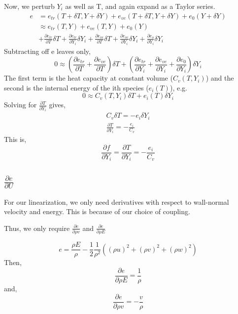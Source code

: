 \documentclass[10pt]{article}
\begin{document}
Now, we perturb $Y_i$ as well as T, and again expand as a Taylor
series. 
\begin{align}
 e &= e_{tr}(T+\delta T, Y + \delta Y ) + e_{ve}(T+\delta T, Y + \delta Y ) + e_{0}(Y + \delta Y) \\
 &\approx e_{tr}(T,Y) +  e_{ve}(T,Y) + e_{0}(Y) \\
 & + \frac{\partial e_{tr}}{\partial T} \delta T + \frac{\partial e_{tr}}{\partial Y_i} \delta Y_i
   + \frac{\partial e_{ve}}{\partial T} \delta T + \frac{\partial e_{ve}}{\partial Y_i} \delta Y_i 
   + \frac{\partial e_{o}}{\partial Y_i} \delta Y_i 
\end{align}
Subtracting off e leaves only,
\begin{equation}
0 \approx \left( \frac{\partial e_{tr}}{\partial T} + \frac{\partial
	   e_{ve}}{\partial T} \right) \delta T + 
           \left( \frac{\partial e_{tr}}{\partial Y_i} + \frac{\partial
	    e_{ve}}{\partial Y_i} + \frac{\partial
	    e_{0}}{\partial Y_i} \right) \delta Y_i
\end{equation}
The first term is the heat capacity at constant volume ($C_v(T,Y_i)$) and the
second is the internal energy of the ith species ($e_i(T)$), e.g. 
\begin{equation}
0 \approx C_v(T,Y_i) \delta T + 
          e_i(T)     \delta Y_i
\end{equation}
Solving for $\frac{\partial T}{\partial Y_i}$ gives, 
\begin{align}
 C_v \delta T = - e_i \delta Y_i \\
 \frac{\partial T}{\partial Y_i} = - \frac{e_i}{C_v}
\end{align}
This is,
\begin{equation}
 \frac{\partial f}{\partial Y_i} = \frac{\partial T}{\partial Y_i} = -\frac{e_i}{C_v}
\end{equation}

%
% 
%
\subsection{$\frac{\partial e}{\partial U}$}

For our linearization, we only need derivatives with respect to
wall-normal velocity and energy. This is because of our choice of
coupling. 

Thus, we only require $\frac{\partial e}{\partial \rho v}$ and
$\frac{\partial e}{\partial \rho E}$

\begin{equation}
e = \frac{\rho E}{\rho } - \frac{1}{2} \frac{1}{\rho^2} \left((\rho u)^2
							+ (\rho v)^2
							+ (\rho w)^2 \right)
\end{equation}
Then, 
\begin{equation}
\frac{\partial e}{\partial \rho E}  = \frac{1}{\rho}
\end{equation}
and,
\begin{equation}
\frac{\partial e}{\partial \rho v}  = -\frac{v}{\rho}
\end{equation}
\end{document}
